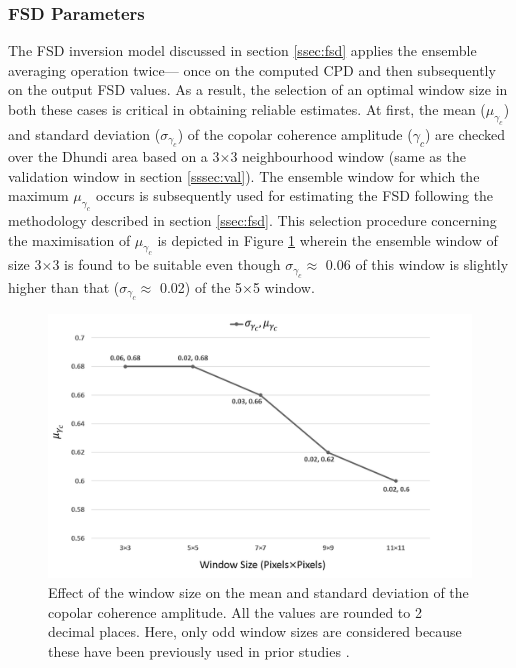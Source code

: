 \documentclass[review]{elsarticle}
\numberwithin{equation}{section}
\numberwithin{figure}{section}
\numberwithin{table}{section}
\begin{document}
\subsubsection{FSD Parameters}
\label{sssec:fsd_param}
The FSD inversion model discussed in section \ref{ssec:fsd} applies the ensemble averaging operation twice--- once on the computed CPD and then subsequently on the output FSD values. As a result, the selection of an optimal window size in both these cases is critical in obtaining reliable estimates. At first, the mean ($\mu_{\gamma_c}$) and standard deviation ($\sigma_{\gamma_c}$) of the copolar coherence amplitude ($\gamma_c$) are checked over the Dhundi area based on a 3$\times$3 neighbourhood window (same as the validation window in section \ref{sssec:val}). The ensemble window for which the maximum $\mu_{\gamma_c}$ occurs is subsequently used for estimating the FSD following the methodology described in section \ref{ssec:fsd}. This selection procedure concerning the maximisation of $\mu_{\gamma_c}$ is depicted in Figure \ref{fig:fsd_coh} wherein the ensemble window of size 3$\times$3 is found to be suitable even though $\sigma_{\gamma_c} \approx$ 0.06 of this window is slightly higher than that ($\sigma_{\gamma_c} \approx$ 0.02) of the 5$\times$5 window.

\begin{figure}[htb]
    \centering
    \includegraphics[width=\textwidth]{Figures/Results/Coh_FSD.png}
    \caption{Effect of the window size on the mean and standard deviation of the copolar coherence amplitude. All the
values are rounded to 2 decimal places. Here, only odd window sizes are considered because these have been previously used in prior studies \citep{Leinss2018, Leinss2014, Kumar2011}.}
    \label{fig:fsd_coh}
\end{figure}
\end{document}

